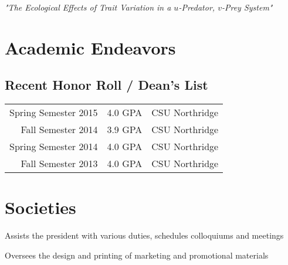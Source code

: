 \documentclass[letterpaper]{deedy-resume} %
\begin{document}
\begin{minipage}[t]{0.66\textwidth}
{\it "The Ecological Effects of Trait Variation in a $u$-Predator, $v$-Prey System"}

\sectionspace %


\section{Academic Endeavors}
\subsection{Recent Honor Roll / Dean's List} 

\begin{tabular}{rll}
Spring Semester 2015 & 4.0 GPA & CSU Northridge\\
Fall Semester 2014 & 3.9 GPA & CSU Northridge\\
Spring Semester 2014 & 4.0 GPA & CSU Northridge\\
Fall Semester 2013 & 4.0 GPA & CSU Northridge\\
\end{tabular}

\sectionspace %


\section{Societies}
\begin{tightitemize}
\item Assists the president with various duties, schedules colloquiums and meetings
\item Oversees the design and printing of marketing and promotional materials
\end{tightitemize}

\sectionspace %



\end{minipage} %
\end{document}
